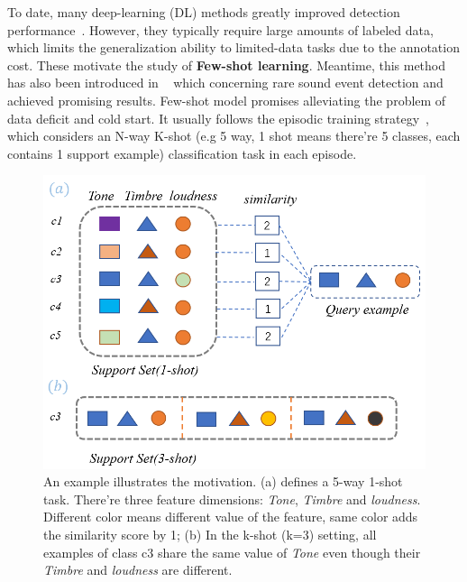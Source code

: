 \documentclass[a4paper]{article}
\begin{document}
To date, many deep-learning (DL) methods greatly improved detection performance~\cite{autoTagging,audiofew,song,park,few-shot-sound-detection}. However, they typically require large amounts of labeled data, which limits the generalization ability to limited-data tasks due to the annotation cost. These motivate the study of \textbf{Few-shot learning}. Meantime, this method has also been introduced in ~\cite{attentionSimilarity,rare,few-att-gnn,fewShotGNN,TPN} which concerning rare sound event detection and achieved promising results. Few-shot model promises alleviating the problem of data deficit and cold start. It usually follows the episodic training strategy~\cite{attentionSimilarity,MatchNet}, which considers an N-way K-shot (e.g 5 way, 1 shot means there’re 5 classes, each contains 1 support example) classification task in each episode.
\begin{figure}[t]
	\centering
	\includegraphics[width=0.95\linewidth]{./pic/idea-3.png}
	\caption{An example illustrates the motivation. (a) defines a 5-way 1-shot task. There’re three feature dimensions: \textit{Tone}, \textit{Timbre} and \textit{loudness}. Different color means different value of the feature, same color adds the similarity score by 1; (b) In the k-shot (k=3) setting, all examples of class c3 share the same value of \textit{Tone} even though their \textit{Timbre} and \textit{loudness} are different. }
	\label{fig:idea}
	\vspace{-4mm}
\end{figure}
\end{document}
